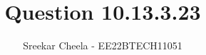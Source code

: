 \documentclass[journal,12pt,twocolumn]{IEEEtran}
\theoremstyle{remark}
\begin{document}
%




\vspace{3cm}

\title{
Question 10.13.3.23
}
\author{Sreekar Cheela - EE22BTECH11051}	


%
%
%

% 
%



% 
\end{document}
